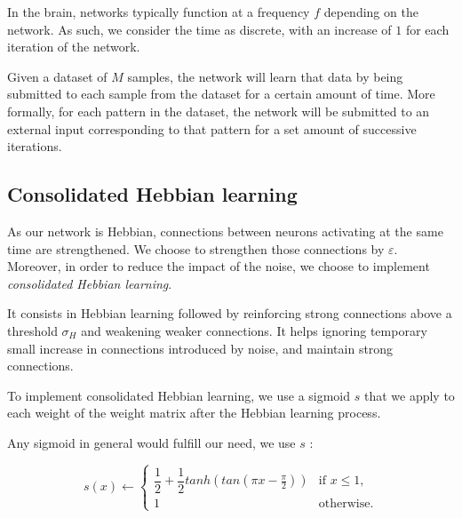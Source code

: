 \documentclass[journal]{IEEEtran}
\begin{document}
In the brain, networks typically function at a frequency $f$\cite{buzsaki2004neuronal} depending on the network. As such, we consider the time as discrete, with an increase of $1$ for each iteration of the network.

Given a dataset of $M$ samples, the network will learn that data by being submitted to each sample from the dataset for a certain amount of time. More formally, for each pattern in the dataset, the network will be submitted to an external input corresponding to that pattern for a set amount of successive iterations.

\subsection{Consolidated Hebbian learning}

As our network is Hebbian, connections between neurons activating at the same time are strengthened. We choose to strengthen those connections by $\varepsilon$. Moreover, in order to reduce the impact of the noise, we choose to implement \emph{consolidated Hebbian learning}\cite{fusi2000spike,gerstner2002mathematical}. 

It consists in Hebbian learning followed by reinforcing strong connections above a threshold $\sigma_{H}$ and weakening weaker connections. It helps ignoring temporary small increase in connections introduced by noise, and maintain strong connections.  

To implement consolidated Hebbian learning, we use a sigmoid $s$ that we apply to each weight of the weight matrix after the Hebbian learning process. 

Any sigmoid in general would fulfill our need, we use $s$ :

\begin{equation}
s(x) \leftarrow \left\{\begin{array}{ll} \dfrac{1}{2} + \dfrac{1}{2}tanh(tan(\pi x-\frac{\pi}{2})) & \mbox {if } x \leq 1, \\
 1 & \mbox {otherwise.}\end{array}\right.
\end{equation}
\end{document}
